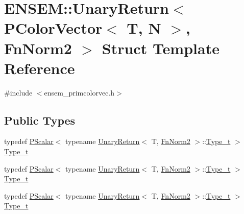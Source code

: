 \hypertarget{structENSEM_1_1UnaryReturn_3_01PColorVector_3_01T_00_01N_01_4_00_01FnNorm2_01_4}{}\section{E\+N\+S\+EM\+:\+:Unary\+Return$<$ P\+Color\+Vector$<$ T, N $>$, Fn\+Norm2 $>$ Struct Template Reference}
\label{structENSEM_1_1UnaryReturn_3_01PColorVector_3_01T_00_01N_01_4_00_01FnNorm2_01_4}


{\ttfamily \#include $<$ensem\+\_\+primcolorvec.\+h$>$}

\subsection*{Public Types}
\begin{DoxyCompactItemize}
\item 
typedef \mbox{\hyperlink{classENSEM_1_1PScalar}{P\+Scalar}}$<$ typename \mbox{\hyperlink{structENSEM_1_1UnaryReturn}{Unary\+Return}}$<$ T, \mbox{\hyperlink{structENSEM_1_1FnNorm2}{Fn\+Norm2}} $>$\+::\mbox{\hyperlink{structENSEM_1_1UnaryReturn_3_01PColorVector_3_01T_00_01N_01_4_00_01FnNorm2_01_4_a5a7744f2bf5fb66bb4cadbb4b85098af}{Type\+\_\+t}} $>$ \mbox{\hyperlink{structENSEM_1_1UnaryReturn_3_01PColorVector_3_01T_00_01N_01_4_00_01FnNorm2_01_4_a5a7744f2bf5fb66bb4cadbb4b85098af}{Type\+\_\+t}}
\item 
typedef \mbox{\hyperlink{classENSEM_1_1PScalar}{P\+Scalar}}$<$ typename \mbox{\hyperlink{structENSEM_1_1UnaryReturn}{Unary\+Return}}$<$ T, \mbox{\hyperlink{structENSEM_1_1FnNorm2}{Fn\+Norm2}} $>$\+::\mbox{\hyperlink{structENSEM_1_1UnaryReturn_3_01PColorVector_3_01T_00_01N_01_4_00_01FnNorm2_01_4_a5a7744f2bf5fb66bb4cadbb4b85098af}{Type\+\_\+t}} $>$ \mbox{\hyperlink{structENSEM_1_1UnaryReturn_3_01PColorVector_3_01T_00_01N_01_4_00_01FnNorm2_01_4_a5a7744f2bf5fb66bb4cadbb4b85098af}{Type\+\_\+t}}
\item 
typedef \mbox{\hyperlink{classENSEM_1_1PScalar}{P\+Scalar}}$<$ typename \mbox{\hyperlink{structENSEM_1_1UnaryReturn}{Unary\+Return}}$<$ T, \mbox{\hyperlink{structENSEM_1_1FnNorm2}{Fn\+Norm2}} $>$\+::\mbox{\hyperlink{structENSEM_1_1UnaryReturn_3_01PColorVector_3_01T_00_01N_01_4_00_01FnNorm2_01_4_a5a7744f2bf5fb66bb4cadbb4b85098af}{Type\+\_\+t}} $>$ \mbox{\hyperlink{structENSEM_1_1UnaryReturn_3_01PColorVector_3_01T_00_01N_01_4_00_01FnNorm2_01_4_a5a7744f2bf5fb66bb4cadbb4b85098af}{Type\+\_\+t}}
\end{DoxyCompactItemize}



